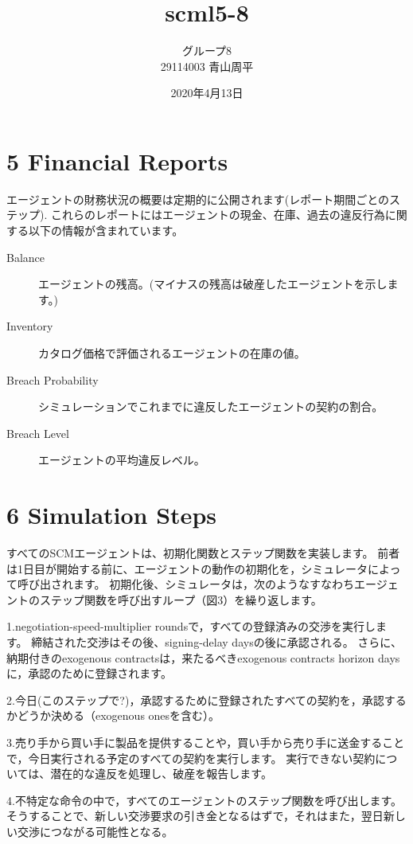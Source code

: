 \documentclass[12pt]{jarticle}
\title{scml5-8}
\author{グループ8\\
  29114003 青山周平\\
}
\date{2020年4月13日}
\begin{document}
\maketitle

\section{5 Financial Reports}
エージェントの財務状況の概要は定期的に公開されます(レポート期間ごとのステップ).
これらのレポートにはエージェントの現金、在庫、過去の違反行為に関する以下の情報が含まれています。

\begin{description}
  \item[Balance] エージェントの残高。(マイナスの残高は破産したエージェントを示します。)
  \item[Inventory] カタログ価格で評価されるエージェントの在庫の値。
  \item[Breach Probability] シミュレーションでこれまでに違反したエージェントの契約の割合。
  \item[Breach Level] エージェントの平均違反レベル。
\end{description}

\section{6 Simulation Steps}
すべてのSCMエージェントは、初期化関数とステップ関数を実装します。
前者は1日目が開始する前に、エージェントの動作の初期化を，シミュレータによって呼び出されます。
初期化後、シミュレータは，次のようなすなわちエージェントのステップ関数を呼び出すループ（図3）を繰り返します。

1.negotiation-speed-multiplier roundsで，すべての登録済みの交渉を実行します。
締結された交渉はその後、signing-delay daysの後に承認される。
さらに、納期付きのexogenous contractsは，来たるべきexogenous contracts horizon daysに，承認のために登録されます。

2.今日(このステップで?)，承認するために登録されたすべての契約を，承認するかどうか決める（exogenous onesを含む）。

3.売り手から買い手に製品を提供することや，買い手から売り手に送金することで，今日実行される予定のすべての契約を実行します。
実行できない契約については、潜在的な違反を処理し、破産を報告します。

4.不特定な命令の中で，すべてのエージェントのステップ関数を呼び出します。
そうすることで、新しい交渉要求の引き金となるはずで，それはまた，翌日新しい交渉につながる可能性となる。
\end{document}
